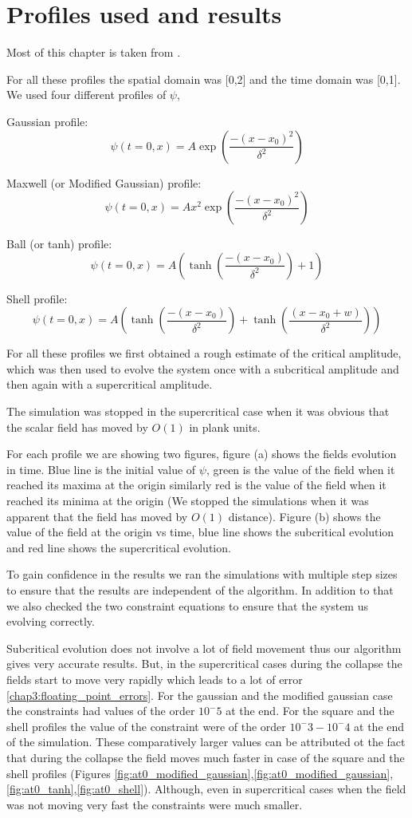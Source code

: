 \chapter{Profiles used and results}
Most of this chapter is taken from \citep{Chaudhary:2020yyv}.

For all these profiles the spatial domain was [0,2] and the time domain was [0,1].
We used four different profiles of $\psi$,


Gaussian profile:
\[
    \psi(t=0, x)=A \exp \left(\frac{-\left(x-x_{0}\right)^{2}}{\delta^{2}}\right)
\]

Maxwell (or Modified Gaussian) profile:
\[
    \psi(t=0, x)=A x^{2} \exp \left(\frac{-\left(x-x_{0}\right)^{2}}{\delta^{2}}\right)
\]

Ball (or tanh) profile:
\[
    \psi(t=0, x)=A\left(\tanh \left(\frac{-\left(x-x_{0}\right)}{\delta^{2}}\right)+1\right)
\]

Shell profile:
\[
    \psi(t=0, x)=A\left(\tanh \left(\frac{-\left(x-x_{0}\right)}{\delta^{2}}\right)+\tanh \left(\frac{\left(x-x_{0}+w\right)}{\delta^{2}}\right)\right)
\]

For all these profiles we first obtained a rough estimate of the critical amplitude, which was then used to evolve the system once with a subcritical amplitude and then again with a supercritical amplitude.

The simulation was stopped in the supercritical case when it was obvious that the scalar field has moved by $O(1)$ in plank units.

For each profile we are showing two figures, figure (a) shows the fields evolution in time. Blue line is the initial value of $\psi$, green is the value of the field when it reached its maxima at the origin similarly red is the value of the field when it reached its minima at the origin (We stopped the simulations when it was apparent that the field has moved by $O(1)$ distance). Figure (b) shows the value of the field at the origin vs time, blue line shows the subcritical evolution and red line shows the supercritical evolution.

To gain confidence in the results we ran the simulations with multiple step sizes to ensure that the results are independent of the algorithm. In addition to that we also checked the two constraint equations to ensure that the system us evolving correctly.

Subcritical evolution does not involve a lot of field movement thus our algorithm gives very accurate results. But, in the supercritical cases during the collapse the fields start to move very rapidly which leads to a lot of error \ref{chap3:floating_point_errors}.
For the gaussian and the modified gaussian case the constraints had values of the order $10^-5$ at the end.
For the square and the shell profiles the value of the constraint were of the order $10^-3-10^-4$ at the end of the simulation. These comparatively larger values can be attributed ot the fact that during the collapse the field moves much faster in case of the square and the shell profiles (Figures \ref{fig:at0_modified_gaussian},\ref{fig:at0_modified_gaussian},\ref{fig:at0_tanh},\ref{fig:at0_shell}).
Although, even in supercritical cases when the field was not moving very fast the constraints were much smaller.

